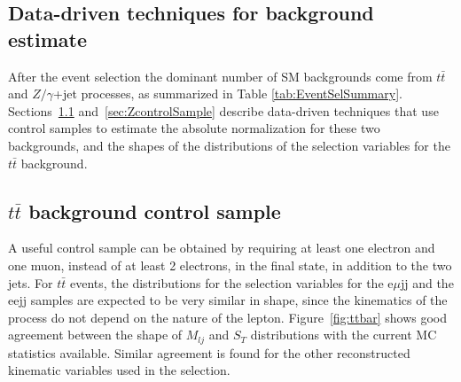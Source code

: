 \documentclass{cmspaper}
\begin{document}
\begin{linenumbers}
\section{Data-driven techniques for background estimate} \label{sec:bkgStudy}
After the event selection the dominant number of SM backgrounds 
 come from $t\bar{t}$ and $Z/\gamma$+jet processes, 
as summarized in Table \ref{tab:EventSelSummary}. 
Sections~\ref{sec:ttbarControlSample} and~\ref{sec:ZcontrolSample} 
describe data-driven techniques that use control samples 
to estimate the absolute 
normalization for these two backgrounds, and the shapes of the distributions of
the selection variables 
for the $t\bar{t}$ background. 

\subsection{$t\bar{t}$ background control sample} \label{sec:ttbarControlSample}
A useful control sample can be obtained by 
requiring at least one electron and one muon, instead of at least 2 electrons, 
in the final state, in addition to the two jets. 
For $t\bar{t}$ events, the distributions for the selection variables
for the e$\mu$jj and the eejj samples
are expected to be very similar in shape, since the kinematics 
of the process do not depend 
on the nature of the lepton. 
Figure~\ref{fig:ttbar} shows good agreement between 
the shape of $M_{lj}$ and $S_{T}$ distributions 
with the current MC statistics available. Similar agreement 
is found for the other reconstructed kinematic variables 
used in the selection. 


\end{linenumbers}
\end{document}
